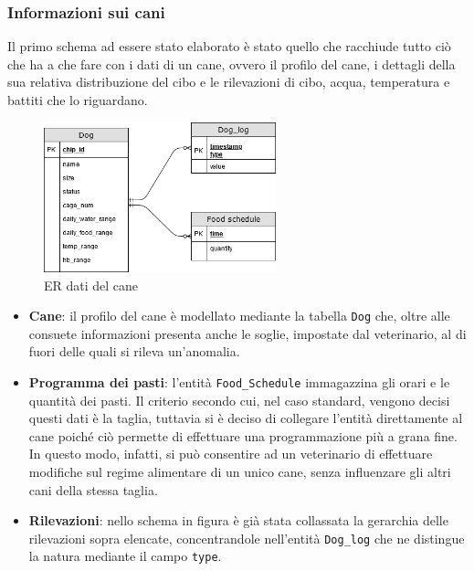     \subsubsection{Informazioni sui cani}
    Il primo schema ad essere stato elaborato è stato quello che racchiude tutto ciò che ha a che fare con i dati di un cane, ovvero il profilo del cane, i dettagli della sua relativa distribuzione del cibo e le rilevazioni di cibo, acqua, temperatura e battiti che lo riguardano.
     \begin{figure}[H]
        \caption{ER dati del cane}
        \label{fig:dogER}
        \centering
        \includegraphics[width=0.6\textwidth]{DrawIo/EntityRelationship.png}
    \end{figure}
    \begin{itemize}
            \item \textbf{Cane}: il profilo del cane è modellato mediante la tabella \texttt{Dog} che, oltre alle consuete informazioni presenta anche le soglie, impostate dal veterinario, al di fuori delle quali si rileva un'anomalia.   
            
            \item \textbf{Programma dei pasti}: l'entità \texttt{Food\_Schedule} immagazzina gli orari e le quantità dei pasti. Il criterio secondo cui, nel caso standard, vengono decisi questi dati è la taglia, tuttavia si è deciso di collegare l'entità direttamente al cane poiché ciò permette di effettuare una programmazione più a grana fine. In questo modo, infatti, si può consentire ad un veterinario di effettuare modifiche sul regime alimentare di un unico cane, senza influenzare gli altri cani della stessa taglia.
            
            \item \textbf{Rilevazioni}: nello schema in figura è già stata collassata la gerarchia delle rilevazioni sopra elencate, concentrandole nell'entità \texttt{Dog\_log} che ne distingue la natura mediante il campo \texttt{type}.
       \end{itemize}
